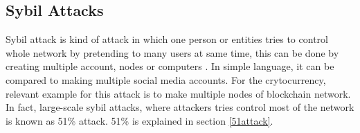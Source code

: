 \documentclass[a4paper,twoside,12pt]{report}
\begin{document}
\begin{spacing}{1.5}
\subsection{Sybil Attacks}
Sybil attack is kind of attack in which one person or entities tries to control whole network by pretending to many users at same time, this can be done by creating multiple account, nodes or computers \cite{zaghloul_beginners_2018}. In simple language, it can be compared to making multiple social media accounts. For the crytocurrency, relevant example for this attack is to make multiple nodes of blockchain network. In fact, large-scale sybil attacks, where attackers tries control most of the network is known as 51\% attack. 51\% is explained in section \ref{51attack}.

\end{spacing}
\end{document}
